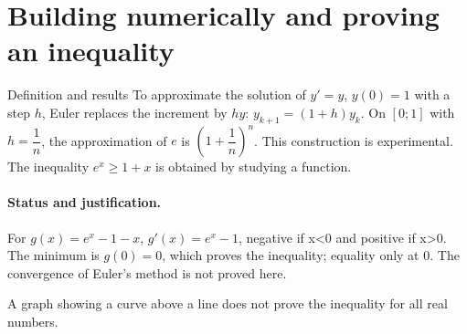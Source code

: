 \section{Building numerically and proving an inequality}\label{C09-U5}
\begin{repere}{Definition and results}
To approximate the solution of $y\prime=y$, $y(0)=1$ with a step $h$, Euler replaces the increment by $hy$: $y_{k+1}=(1+h)y_k$. On $[0;1]$ with $h=\dfrac1n$, the approximation of $e$ is $\left(1+\dfrac1n\right)^n$. This construction is experimental. The inequality $e^x\geq1+x$ is obtained by studying a function.
\end{repere}
\paragraph{Status and justification.} For $g(x)=e^x-1-x$, $g\prime(x)=e^x-1$, negative if x<0 and positive if x>0. The minimum is $g(0)=0$, which proves the inequality; equality only at 0. The convergence of Euler's method is not proved here.
\label{C09-EX5}
\begin{erreur}A graph showing a curve above a line does not prove the inequality for all real numbers.\end{erreur}
\label{C09-AP5}
